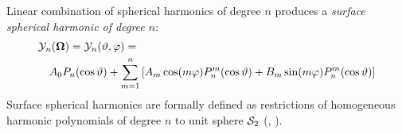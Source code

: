 Linear combination of spherical
harmonics of degree $n$ produces a \textit{surface spherical harmonic of degree $n$}:
\begin{equation*}
\begin{multlined}
    \mathcal{Y}_n(\bomega) = \mathcal{Y}_n(\polar,\azimuthal) = \\A_0 P_n(\cos\polar) + \suma[m]{1}{n}\left[ A_m
    \cos(m\azimuthal)\P{n}{m}(\cos\polar) + B_m \sin(m\azimuthal)\P{n}{m}(\cos\polar)\right]
  \end{multlined}
  \end{equation*}
Surface spherical harmonics are formally defined as restrictions of homogeneous harmonic polynomials of degree $n$ to
unit sphere $\mathcal{S}_2$ (\cite[Art. 110]{Byerly}, \cite[Def. 3.22]{Schreiner}).



